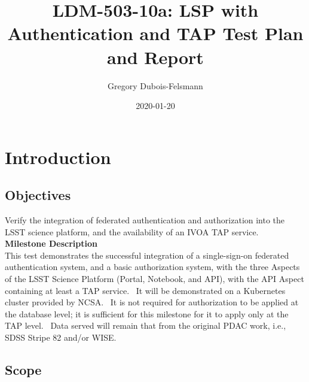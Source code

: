 \documentclass[DM,STR,toc]{lsstdoc}
\begin{document}
\def\milestoneName{LSP with Authentication and TAP}
\def\milestoneId{LDM-503-10a:}
\def\product{LSP Services}


\title{ LDM-503-10a: LSP with Authentication and TAP Test Plan and Report}
\setDocRef{\lsstDocType-\lsstDocNum}
\date{2020-01-20}
\author{ Gregory Dubois-Felsmann }






\maketitle

\section{Introduction}
\label{sect:intro}


\subsection{Objectives}
\label{sect:objectives}

Verify the integration of federated authentication and authorization
into the LSST science platform, and the availability of an IVOA TAP
service.\\[2\baselineskip]\textbf{Milestone
Description}\\[2\baselineskip]This test demonstrates the successful
integration of a single-sign-on federated authentication system, and a
basic authorization system, with the three Aspects of the LSST Science
Platform (Portal, Notebook, and API), with the API Aspect containing at
least a TAP service. ~It will be demonstrated on a Kubernetes cluster
provided by NCSA. ~It is not required for authorization to be applied at
the database level; it is sufficient for this milestone for it to apply
only at the TAP level. ~Data served will remain that from the original
PDAC work, i.e., SDSS Stripe 82 and/or WISE.\\[2\baselineskip]

\subsection{Scope}\label{scope}
\end{document}
